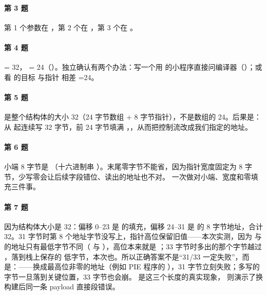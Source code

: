 \documentclass[UTF8,12pt,oneside]{ctexbook}
\begin{document}
\paragraph{第 3 题}第 1 个参数在 ，第 2 个在 ，第 3 个在 。

\paragraph{第 4 题} = 32， = 24（）。独立确认有两个办法：写一个用  的小程序直接问编译器（）；或  看  的目标  与指针  相差 =24。

\paragraph{第 5 题} 是整个结构体的大小 32（24 字节数组 + 8 字节指针），不是数组的 24。后果是： 从  起连续写 32 字节，前 24 字节填满 ，，从而把控制流改成我们指定的地址。

\paragraph{第 6 题}小端 8 字节是 （十六进制串 ）。末尾零字节不能省，因为指针宽度固定为 8 字节，少写零会让后续字段错位、读出的地址也不对。 一次做对小端、宽度和零填充三件事。

\paragraph{第 7 题}因为结构体大小是 32：偏移 0--23 是  的填充，偏移 24--31 是  的 8 字节地址，合计 32。31 字节时第 8 个地址字节没写上，指针高位保留旧值——本次实测，因为  与  的地址只有最低字节不同（ 与 ），高位本来就是 ；33 字节时多出的那个字节越过 ，落到栈上保存的  低字节，本次也。所以正确答案不是“31/33 一定失败”，而是：——换成最高位非零的地址（例如 PIE 程序的 ），31 字节立刻失败；多写的字节一旦落到关键位置，33 字节也会崩。 是这三个长度的真实现象， 则演示了换构建后同一条 payload 直接段错误。
\end{document}
